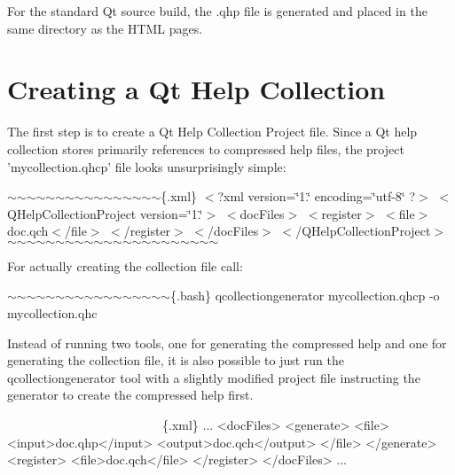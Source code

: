 For the standard Qt source build, the .qhp file is generated and placed in the same directory as the H\-T\-M\-L pages.\hypertarget{collection_collection_create}{}\section{Creating a Qt Help Collection}\label{collection_collection_create}
The first step is to create a Qt Help Collection Project file. Since a Qt help collection stores primarily references to compressed help files, the project 'mycollection.\-qhcp' file looks unsurprisingly simple\-:

$\sim$$\sim$$\sim$$\sim$$\sim$$\sim$$\sim$$\sim$$\sim$$\sim$$\sim$$\sim$$\sim$$\sim$$\sim$$\sim$\{.xml\} $<$?xml version=\char`\"{}1.\char`\"{} encoding=\char`\"{}utf-\/8\char`\"{} ?$>$ $<$\-Q\-Help\-Collection\-Project version=\char`\"{}1.\char`\"{}$>$ $<$doc\-Files$>$ $<$register$>$ $<$file$>$doc.\-qch$<$/file$>$ $<$/register$>$ $<$/doc\-Files$>$ $<$/\-Q\-Help\-Collection\-Project$>$ $\sim$$\sim$$\sim$$\sim$$\sim$$\sim$$\sim$$\sim$$\sim$$\sim$$\sim$$\sim$$\sim$$\sim$$\sim$$\sim$$\sim$$\sim$$\sim$$\sim$$\sim$$\sim$

For actually creating the collection file call\-:

$\sim$$\sim$$\sim$$\sim$$\sim$$\sim$$\sim$$\sim$$\sim$$\sim$$\sim$$\sim$$\sim$$\sim$$\sim$$\sim$$\sim$\{.bash\} qcollectiongenerator mycollection.\-qhcp -\/o mycollection.\-qhc 
\begin{DoxyCode}
Instead of running two tools, one \textcolor{keywordflow}{for} generating the compressed help and one \textcolor{keywordflow}{
      for} generating the collection file, it is also possible to just run the 
qcollectiongenerator tool with a slightly modified project file instructing the
       generator to create the compressed help first.

~~~~~~~~~~~~~~~~~~~~~~~~~\{.xml\}
 ...
 <docFiles>
     <generate>
         <file>
             <input>doc.qhp</input>
             <output>doc.qch</output>
         </file>
     </generate>
     <\textcolor{keyword}{register}>
         <file>doc.qch</file>
     </\textcolor{keyword}{register}>
 </docFiles>
 ...
\end{DoxyCode}


